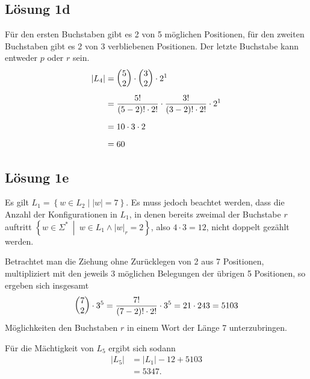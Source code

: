\documentclass[main.tex]{subfiles}
\begin{document}
\subsection{Lösung 1d}
Für den ersten Buchstaben gibt es 2 von 5 möglichen Positionen, für den zweiten Buchstaben gibt es 2 von 3 verbliebenen Positionen.
Der letzte Buchstabe kann entweder $p$ oder $r$ sein.
\begin{align*}
    |L_4| &= \vektor{5\\ 2} \cdot \vektor{3\\ 2} \cdot 2^1 \\[1mm]
        &= \frac{5!}{(5-2)!\cdot 2!} \cdot \frac{3!}{(3-2)!\cdot 2!} \cdot 2^1 \\[2mm]
        &= 10 \cdot 3 \cdot 2 \\[2mm]
        &= 60
\end{align*}

\subsection{Lösung 1e}

Es gilt $L_1 = \left\{w \in L_2 \middle| |w|=7\right\}$. Es muss jedoch beachtet werden, dass die Anzahl der Konfigurationen in $L_1$,
in denen bereits zweimal der Buchstabe $r$ auftritt $\left\{ w\in \Sigma^*\ \middle|\ w\in L_1 \land |w|_r = 2 \right\}$,
also $4\cdot3 = 12$, nicht doppelt gezählt werden.

Betrachtet man die Ziehung ohne Zurücklegen von 2 aus 7 Positionen, multipliziert mit den jeweils 3 möglichen Belegungen der übrigen 5 Positionen, so ergeben sich
insgesamt
$$
    \vektor{7\\ 2} \cdot 3^5 = \frac{7!}{(7-2)!\cdot 2!} \cdot 3^5 = 21 \cdot 243 = 5103
$$
Möglichkeiten den Buchstaben $r$ in einem Wort der Länge 7 unterzubringen.

Für die Mächtigkeit von $L_5$ ergibt sich sodann
\begin{align*}
    |L_5| &= |L_1| - 12 + 5103 \\[1mm]
          &= 5347.
\end{align*}
\end{document}
